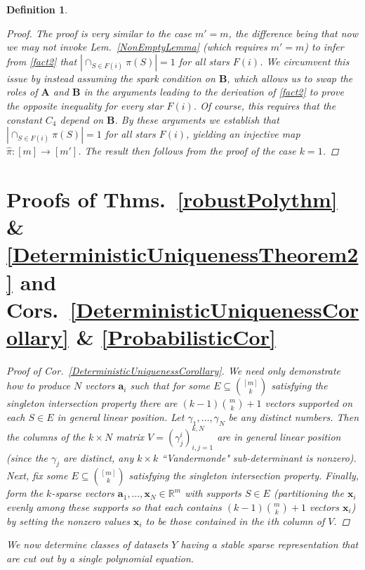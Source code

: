 \documentclass[9pt,twocolumn]{pnas-new}
\newtheorem{definition}{Definition}
\begin{document}
\begin{definition}
\begin{proof}
The proof is very similar to the case $m' = m$, the difference being that now we may not invoke Lem.~\ref{NonEmptyLemma} (which requires $m' = m$) to infer from \eqref{fact2} that $| \cap_{S \in F(i)} \pi(S) | = 1$ for all stars $F(i)$. We circumvent this issue by instead assuming the spark condition on $\mathbf{B}$, which allows us to swap the roles of $\mathbf{A}$ and $\mathbf{B}$ in the arguments leading to the derivation of \eqref{fact2} to prove the opposite inequality for every star $F(i)$. Of course, this requires that the constant $C_4$  depend on $\mathbf{B}$. By these arguments we establish that $| \cap_{S \in F(i)} \pi(S) | = 1$ for all stars $F(i)$, yielding an injective map $\hat \pi: [m] \to [m']$. The result then follows from the proof of the case $k=1$. 
\end{proof}

\section{Proofs of Thms.~\ref{robustPolythm} \& \ref{DeterministicUniquenessTheorem2} and Cors.~\ref{DeterministicUniquenessCorollary} \& \ref{ProbabilisticCor}}\label{AppendixB}

\begin{proof}[Proof of Cor.~\ref{DeterministicUniquenessCorollary}]
We need only demonstrate how to produce $N$ vectors $\mathbf{a}_i$ such that for some $E \subseteq {[m] \choose k}$ satisfying the singleton intersection property there are \mbox{$(k-1){m \choose k}+1$} vectors supported on each $S \in E$ in general linear position. Let $\gamma_1, \ldots, \gamma_N$ be any distinct numbers. Then the columns of the $k \times N$ matrix $V = (\gamma^i_j)^{k,N}_{i,j=1}$ are in general linear position (since the $\gamma_j$ are distinct, any $k \times k$ ``Vandermonde" sub-determinant is nonzero). Next, fix some $E \subseteq {[m] \choose k}$ satisfying the singleton intersection property. Finally, form the $k$-sparse vectors $\mathbf{a}_1, \ldots, \mathbf{x}_N \in \mathbb{R}^m$ with supports $S \in E$ (partitioning the $\mathbf{x}_i$ evenly among these supports so that each contains $(k-1){m \choose k}+1$ vectors $\mathbf{x}_i$) by setting the nonzero values $\mathbf{x}_i$ to be those contained in the $i$th column of $V$.
\end{proof}

We now determine classes of datasets $Y$ having a stable sparse representation that are cut out by a single polynomial equation.


\end{definition}
\end{document}
